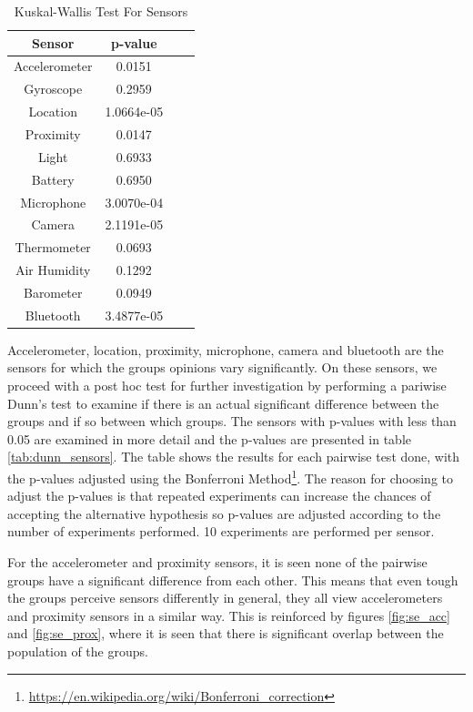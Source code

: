 \begin{table}[h!]
  \centering
  \caption{Kuskal-Wallis Test For Sensors}
  \label{tab:kw_sensors}
  \begin{tabular}{cccc}
    \toprule
     Sensor & p-value \\
    \midrule
    Accelerometer & 0.0151 \\
    Gyroscope & 0.2959\\
    Location & 1.0664e-05\\
    Proximity & 0.0147\\ 
    Light & 0.6933\\
    Battery & 0.6950\\ 
    Microphone & 3.0070e-04\\
    Camera & 2.1191e-05\\
    Thermometer & 0.0693\\ 
    Air Humidity & 0.1292\\
    Barometer & 0.0949\\
    Bluetooth & 3.4877e-05\\ 
    \bottomrule
  \end{tabular}
\end{table} 

Accelerometer, location, proximity, microphone, camera and bluetooth are the sensors for which the groups opinions vary significantly.
On these sensors, we proceed with a post hoc test for further investigation by performing a pariwise Dunn's test to examine if there is an actual significant difference between the groups and if so between which groups. The sensors with p-values with less than 0.05 are examined in more detail and the p-values are presented in table \ref{tab:dunn_sensors}. The table shows the results for each pairwise test done, with the p-values adjusted using the Bonferroni Method\footnote{\url{https://en.wikipedia.org/wiki/Bonferroni\_correction}}. The reason for choosing to adjust the p-values is that repeated experiments can increase the chances of accepting the alternative hypothesis so p-values are adjusted according to the number of experiments performed. 10 experiments are performed per sensor.

For the accelerometer and proximity sensors, it is seen none of the pairwise groups have a significant difference from each other. This means that even tough the groups perceive sensors differently in general, they all view accelerometers and proximity sensors in a similar way. This is reinforced by figures \ref{fig:se_acc} and \ref{fig:se_prox}, where it is seen that there is significant overlap between the population of the groups.

